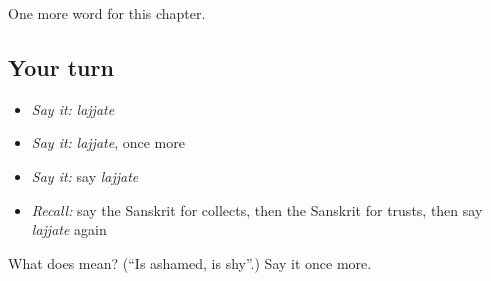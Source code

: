 \begin{grammarlens}[title={What you've built}]
One more word for this chapter.
\end{grammarlens}

\subsection*{Your turn}
\begin{itemize}
\raggedright
  \item \emph{Say it:} \emph{lajjate}
  \item \emph{Say it:} \emph{lajjate}, once more
  \item \emph{Say it:} say \emph{lajjate}
  \item \emph{Recall:} say the Sanskrit for collects, then the Sanskrit for trusts, then say \emph{lajjate} again
\end{itemize}

\begin{tcolorbox}[breakable,colback=teal!4,colframe=teal!35!black,title={Before you move on}]
What does  mean? (\textquotedblleft{}Is ashamed, is shy\textquotedblright{}.) Say it once more.
\end{tcolorbox}
